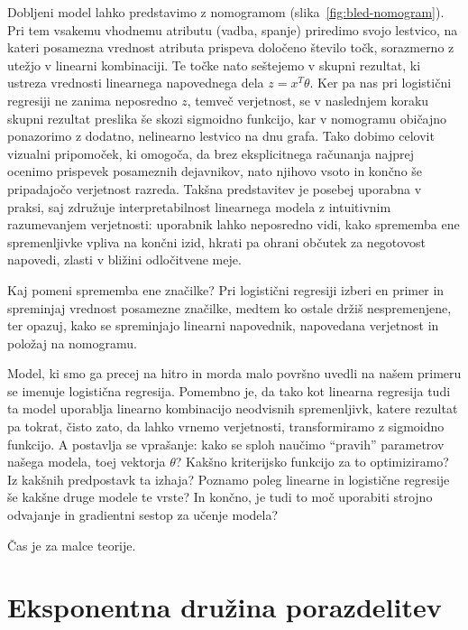 Dobljeni model lahko predstavimo z nomogramom (slika~\ref{fig:bled-nomogram}). Pri tem vsakemu vhodnemu atributu (vadba, spanje) priredimo svojo lestvico, na kateri posamezna vrednost atributa prispeva določeno število točk, sorazmerno z utežjo v linearni kombinaciji. Te točke nato seštejemo v skupni rezultat, ki ustreza vrednosti linearnega napovednega dela $z = x^T\theta$. Ker pa nas pri logistični regresiji ne zanima neposredno $z$, temveč verjetnost, se v naslednjem koraku skupni rezultat preslika še skozi sigmoidno funkcijo, kar v nomogramu običajno ponazorimo z dodatno, nelinearno lestvico na dnu grafa. Tako dobimo celovit vizualni pripomoček, ki omogoča, da brez eksplicitnega računanja najprej ocenimo prispevek posameznih dejavnikov, nato njihovo vsoto in končno še pripadajočo verjetnost razreda. Takšna predstavitev je posebej uporabna v praksi, saj združuje interpretabilnost linearnega modela z intuitivnim razumevanjem verjetnosti: uporabnik lahko neposredno vidi, kako sprememba ene spremenljivke vpliva na končni izid, hkrati pa ohrani občutek za negotovost napovedi, zlasti v bližini odločitvene meje.

\begin{exercise}{Kaj pomeni sprememba ene značilke?}
Pri logistični regresiji izberi en primer in spreminjaj vrednost posamezne značilke, medtem ko ostale držiš nespremenjene, ter opazuj, kako se spreminjajo linearni napovednik, napovedana verjetnost in položaj na nomogramu.
\end{exercise}

Model, ki smo ga precej na hitro in morda malo površno uvedli na našem primeru se imenuje logistična regresija. Pomembno je, da tako kot linearna regresija tudi ta model uporablja linearno kombinacijo neodvisnih spremenljivk, katere rezultat pa tokrat, čisto zato, da lahko vrnemo verjetnosti, transformiramo z sigmoidno funkcijo. A postavlja se vprašanje: kako se sploh naučimo ``pravih'' parametrov našega modela, toej vektorja $\theta$? Kakšno kriterijsko funkcijo za to optimiziramo? Iz kakšnih predpostavk ta izhaja? Poznamo poleg linearne in logistične regresije še kakšne druge modele te vrste? In končno, je tudi to moč uporabiti strojno odvajanje in gradientni sestop za učenje modela?

Čas je za malce teorije.

\section{Eksponentna družina porazdelitev}

